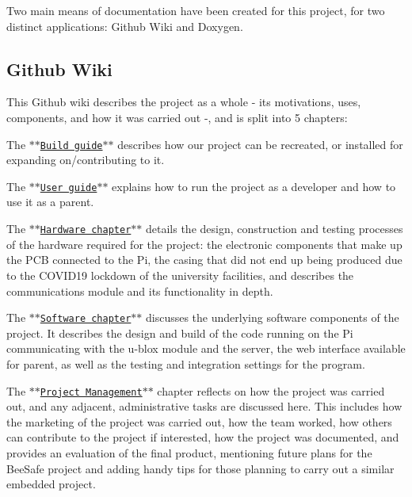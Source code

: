 Two main means of documentation have been created for this project, for two distinct applications\+: Github Wiki and Doxygen.

\subsection*{Github Wiki}

This Github wiki describes the project as a whole -\/ its motivations, uses, components, and how it was carried out -\/, and is split into 5 chapters\+: ~\newline

\begin{DoxyItemize}
\item The $\ast$$\ast$\href{https://github.com/itsBelinda/ENG5220-2020-Team13/wiki/Build-Guide}{\tt Build guide}$\ast$$\ast$ describes how our project can be recreated, or installed for expanding on/contributing to it.
\item The $\ast$$\ast$\href{https://github.com/itsBelinda/ENG5220-2020-Team13/wiki/User-Guide}{\tt User guide}$\ast$$\ast$ explains how to run the project as a developer and how to use it as a parent.
\item The $\ast$$\ast$\href{https://github.com/itsBelinda/ENG5220-2020-Team13/wiki/Hardware}{\tt Hardware chapter}$\ast$$\ast$ details the design, construction and testing processes of the hardware required for the project\+: the electronic components that make up the P\+CB connected to the Pi, the casing that did not end up being produced due to the C\+O\+V\+I\+D19 lockdown of the university facilities, and describes the communications module and its functionality in depth.
\item The $\ast$$\ast$\href{https://github.com/itsBelinda/ENG5220-2020-Team13/wiki/Software}{\tt Software chapter}$\ast$$\ast$ discusses the underlying software components of the project. It describes the design and build of the code running on the Pi communicating with the u-\/blox module and the server, the web interface available for parent, as well as the testing and integration settings for the program.
\item The $\ast$$\ast$\href{https://github.com/itsBelinda/ENG5220-2020-Team13/wiki/Project-Management}{\tt Project Management}$\ast$$\ast$ chapter reflects on how the project was carried out, and any adjacent, administrative tasks are discussed here. This includes how the marketing of the project was carried out, how the team worked, how others can contribute to the project if interested, how the project was documented, and provides an evaluation of the final product, mentioning future plans for the Bee\+Safe project and adding handy tips for those planning to carry out a similar embedded project.
\end{DoxyItemize}


